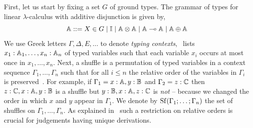 \documentclass[submission,copyright,creativecommons]{eptcs}
\begin{document}
First, let us start by fixing a set $G$ of ground types.  The grammar of types
for linear $\lambda$-calculus with additive disjunction is given by,
\[
  \mathbb{A} ::=  X \in G \mid \mathbb{I} \mid 
  \mathbb{A} \otimes \mathbb{A} \mid \mathbb{A} \multimap \mathbb{A} \mid \mathbb{A} \oplus \mathbb{A}
\] 
We use Greek letters $\Gamma,\Delta, E,\dots$ to denote \emph{typing contexts},
\ie\ lists $x_1 : \mathbb{A}_1,\dots,x_n : \mathbb{A}_n$ of typed variables such that
each variable $x_i$ occurs at most once in $x_1,\dots,x_n$. Next, a shuffle is
a permutation of typed variables in a context sequence
$\Gamma_1,\dots,\Gamma_n$ such that for all $i \leq n$ the relative order of
the variables in $\Gamma_i$ is preserved~\cite{shulman19}. For example, if
$\Gamma_1 = x : \mathbb{A}, y : \mathbb{B}$ and $\Gamma_2 = z : \mathbb{C}$ then $z :
\mathbb{C}, x : \mathbb{A}, y : \mathbb{B}$ is a shuffle but $y : \mathbb{B}, x : \mathbb{A}, z :
\mathbb{C}$ is \emph{not} -- because we changed the order in which $x$ and $y$ appear
in $\Gamma_1$.  We denote by $\mathrm{Sf}(\Gamma_1;\dots;\Gamma_n)$ the set of
shuffles on $\Gamma_1,\dots,\Gamma_n$.  As explained
in~\cite{shulman19,dahlqvist22,dahlqvist23b} such a restriction on relative
orders is crucial for judgements having unique derivations. 
\end{document}
